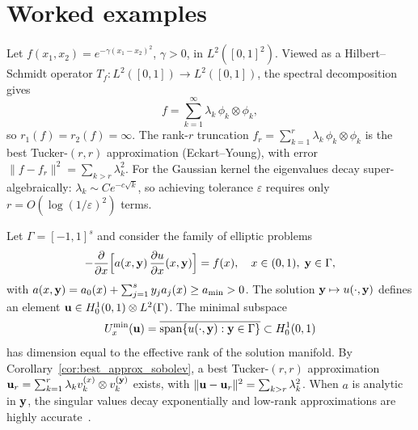 \section{Worked examples}
\label{sec:min:examples}

\begin{example}
\label{ex:min:gaussian}
Let $f(x_1,x_2) = e^{-\gamma(x_1-x_2)^2}$, $\gamma > 0$, in
$L^2([0,1]^2)$. Viewed as a Hilbert--Schmidt operator
$T_f: L^2([0,1]) \to L^2([0,1])$, the spectral decomposition gives
\begin{equation*}
    f = \sum_{k=1}^\infty \lambda_k\, \phi_k \otimes \phi_k,
\end{equation*}
so $r_1(f) = r_2(f) = \infty$. The rank-$r$ truncation
$f_r = \sum_{k=1}^r \lambda_k\, \phi_k \otimes \phi_k$ is the best
Tucker-$(r,r)$ approximation (Eckart--Young), with error
$\|f - f_r\|^2 = \sum_{k>r} \lambda_k^2$. For the Gaussian kernel
the eigenvalues decay super-algebraically:
$\lambda_k \sim C e^{-c\sqrt{k}}$, so achieving tolerance $\varepsilon$
requires only $r = O(\log(1/\varepsilon)^2)$ terms.
\end{example}

\begin{example}
\label{ex:min:parametric_pde}
Let $\Gamma = [-1,1]^s$ and consider the family of elliptic problems
\begin{equation}
\label{eq:parametric_pde}
    -\frac{\partial}{\partial x}
    \Bigl[a(x,\mathbf{y})\,\frac{\partial u}{\partial x}(x,\mathbf{y})\Bigr] = f(x),
    \quad x \in (0,1),\;\mathbf{y} \in \Gamma,
\end{equation}
with $a(x,\mathbf{y}) = a_0(x) + \sum_{j=1}^s y_j a_j(x) \geq a_{\min} > 0$.
The solution $\mathbf{y} \mapsto u(\cdot,\mathbf{y})$ defines an element
$\mathbf{u} \in H_0^1(0,1) \otimes L^2(\Gamma)$. The minimal subspace
\begin{equation*}
    U^{\min}_{x}(\mathbf{u})
    = \overline{\mathrm{span}\{u(\cdot,\mathbf{y}) : \mathbf{y} \in \Gamma\}}
    \subset H_0^1(0,1)
\end{equation*}
has dimension equal to the effective rank of the solution manifold.
By Corollary~\ref{cor:best_approx_sobolev}, a best Tucker-$(r,r)$
approximation $\mathbf{u}_r = \sum_{k=1}^r \lambda_k v_k^{(x)} \otimes
v_k^{(\mathbf{y})}$ exists, with $\|\mathbf{u} - \mathbf{u}_r\|^2 = \sum_{k>r}\lambda_k^2$.
When $a$ is analytic in $\mathbf{y}$, the singular values decay exponentially
and low-rank approximations are highly accurate~\cite{Nouy2017}.
\end{example}

